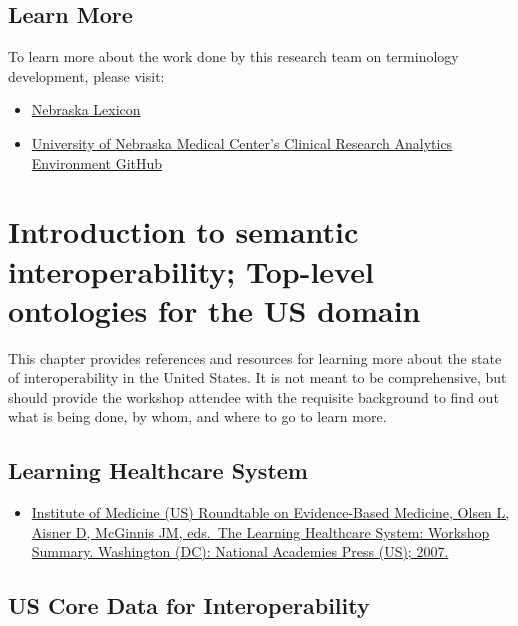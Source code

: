 \documentclass[
]{journal}
\providecommand{\tightlist}{%
  \setlength{\itemsep}{0pt}\setlength{\parskip}{0pt}}
\begin{document}
\hypertarget{learn-more}{%
\subsection{Learn More}\label{learn-more}}

To learn more about the work done by this research team on terminology development, please visit:

\begin{itemize}
\item
  \href{https://www.unmc.edu/pathology-research/bioinformatics/campbell/tdc.html}{Nebraska Lexicon}
\item
  \href{https://github.com/UNMC-CRANE}{University of Nebraska Medical Center's Clinical Research Analytics Environment GitHub}
\end{itemize}

\hypertarget{introduction-to-semantic-interoperability-top-level-ontologies-for-the-us-domain}{%
\section{Introduction to semantic interoperability; Top-level ontologies for the US domain}\label{introduction-to-semantic-interoperability-top-level-ontologies-for-the-us-domain}}

This chapter provides references and resources for learning more about the state of interoperability in the United States. It is not meant to be comprehensive, but should provide the workshop attendee with the requisite background to find out what is being done, by whom, and where to go to learn more.

\hypertarget{learning-healthcare-system}{%
\subsection{Learning Healthcare System}\label{learning-healthcare-system}}

\begin{itemize}
\tightlist
\item
  \href{https://pubmed.ncbi.nlm.nih.gov/21452449/}{Institute of Medicine (US) Roundtable on Evidence-Based Medicine, Olsen L, Aisner D, McGinnis JM, eds.~The Learning Healthcare System: Workshop Summary. Washington (DC): National Academies Press (US); 2007.}
\end{itemize}

\hypertarget{us-core-data-for-interoperability}{%
\subsection{US Core Data for Interoperability}\label{us-core-data-for-interoperability}}
\end{document}
